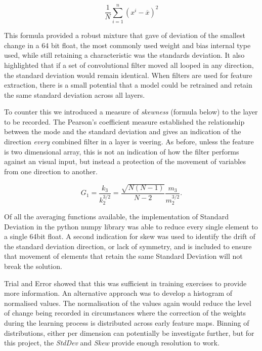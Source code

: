 \begin{equation}
    \label{eqn:stdev}
    \frac1N\sum_{i=1}^n\left(x^i-\overline x\right)^2
\end{equation}

This formula provided a robust mixture that gave of deviation of the smallest change in a 64 bit float, the most commonly used weight and bias internal type used, while still retaining a characteristic was the standards deviation. It also highlighted that if a set of convolutional filter moved all looped in any direction, the standard deviation would remain identical. When filters are used for feature extraction, there is a small potential that a model could be retrained and retain the same standard deviation across all layers.

To counter this we introduced a measure of \textit{skewness} (formula below) to the layer to be recorded. The Pearson's coefficient measure established the relationship between the mode and the standard deviation and gives an indication of the direction \textit{every} combined filter in a layer is veering. As before, unless the feature is two dimensional array, this is not an indication of how the filter performs against an visual input, but instead a protection of the movement of variables from one direction to another.  

\begin{equation}
    \label{eqn:skew}
    G_1=\frac{k_3}{k_2^{3/2}}=\frac{\sqrt{N(N-1)}}{N-2}\frac{m_3}{m_2^{3/2}}.
\end{equation}


Of all the averaging functions available, the implementation of Standard Deviation in the python numpy library was able to reduce every single element to a single 64bit float. A second indication for skew was used to identify the drift of the standard deviation direction, or lack of symmetry,  and is included to ensure that movement of elements that retain the same Standard Deviation will not break the solution.

Trial and Error showed that this was sufficient in training exercises to provide more information. An alternative approach was to develop a histogram of normalised values. The normalisation of the values again would reduce the level of change being recorded in circumstances where the correction of the weights during the learning process is distributed across early feature maps. Binning of distributions, either per dimension can potentially be investigate further, but for this project, the \textit{StdDev} and \textit{Skew} provide enough resolution to work.

